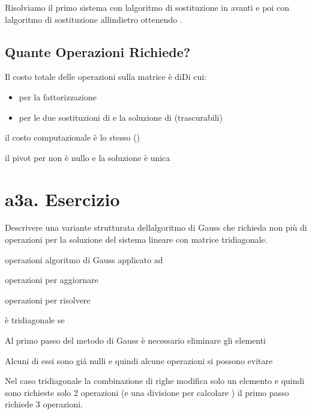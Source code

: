 \documentclass[
]{article}
\providecommand{\tightlist}{%
  \setlength{\itemsep}{0pt}\setlength{\parskip}{0pt}}
\begin{document}
Risolviamo il primo sistema {} con l\textquotesingle algoritmo di
sostituzione in avanti e poi {} con l\textquotesingle algoritmo di
sostituzione all\textquotesingle indietro ottenendo {}.

\hypertarget{quante-operazioni-richiede}{%
\subsection{Quante Operazioni
Richiede?}\label{quante-operazioni-richiede}}

Il costo totale delle operazioni sulla matrice {} è di{}Di cui:

\begin{itemize}
\tightlist
\item
  {} per la fattorizzazione
\item
  {} per le due sostituzioni di {} e la soluzione di {} (trascurabili)
\end{itemize}

il costo computazionale è lo stesso ({})

il pivot per {} non è nullo e la soluzione è unica {}

\hypertarget{a3a.-esercizio}{%
\section{a3a. Esercizio}\label{a3a.-esercizio}}

Descrivere una variante strutturata dell\textquotesingle algoritmo di
Gauss che richieda non più di {} operazioni per la soluzione del sistema
lineare {} con {} matrice tridiagonale.

{}

{}

{} operazioni algoritmo di Gauss applicato ad {}

{} operazioni per aggiornare {}

{} operazioni per risolvere {}

{} è tridiagonale se {}

Al primo passo del metodo di Gauss è necessario eliminare gli elementi

{}

Alcuni di essi sono già nulli e quindi alcune operazioni si possono
evitare

{}

Nel caso tridiagonale la combinazione di righe modifica solo un elemento
e quindi sono richieste solo 2 operazioni (e una divisione per calcolare
{}) il primo passo richiede 3 operazioni.
\end{document}
